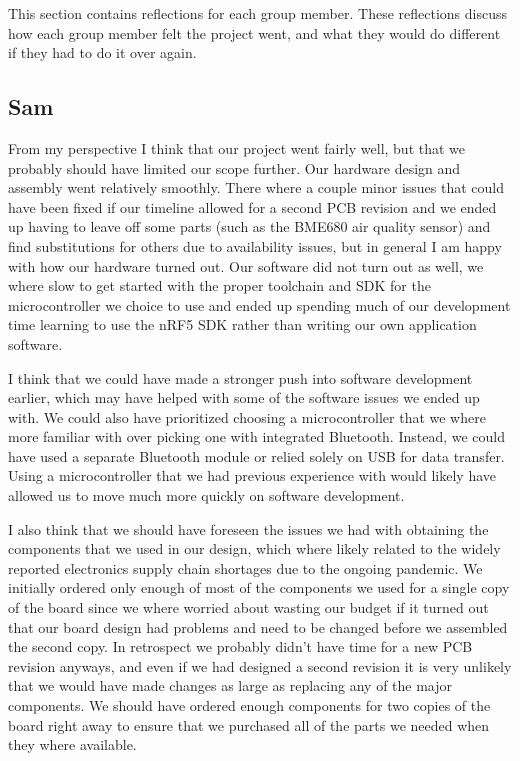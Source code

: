 This section contains reflections for each group member. These reflections
discuss how each group member felt the project went, and what they would do
different if they had to do it over again.

\subsection{Sam}

From my perspective I think that our project went fairly well, but that we
probably should have limited our scope further. Our hardware design and assembly
went relatively smoothly. There where a couple minor issues that could have been
fixed if our timeline allowed for a second PCB revision and we ended up having
to leave off some parts (such as the BME680 air quality sensor) and find
substitutions for others due to availability issues, but in general I am happy
with how our hardware turned out. Our software did not turn out as well, we
where slow to get started with the proper toolchain and SDK for the
microcontroller we choice to use and ended up spending much of our development
time learning to use the nRF5 SDK rather than writing our own application
software.

I think that we could have made a stronger push into software development
earlier, which may have helped with some of the software issues we ended up
with. We could also have prioritized choosing a microcontroller that we where
more familiar with over picking one with integrated Bluetooth. Instead, we could
have used a separate Bluetooth module or relied solely on USB for data transfer.
Using a microcontroller that we had previous experience with would likely have
allowed us to move much more quickly on software development.

I also think that we should have foreseen the issues we had with obtaining the
components that we used in our design, which where likely related to the widely
reported electronics supply chain shortages due to the ongoing pandemic. We
initially ordered only enough of most of the components we used for a single
copy of the board since we where worried about wasting our budget if it turned
out that our board design had problems and need to be changed before we
assembled the second copy. In retrospect we probably didn't have time for a new
PCB revision anyways, and even if we had designed a second revision it is very
unlikely that we would have made changes as large as replacing any of the major
components. We should have ordered enough components for two copies of the
board right away to ensure that we purchased all of the parts we needed when
they where available.

